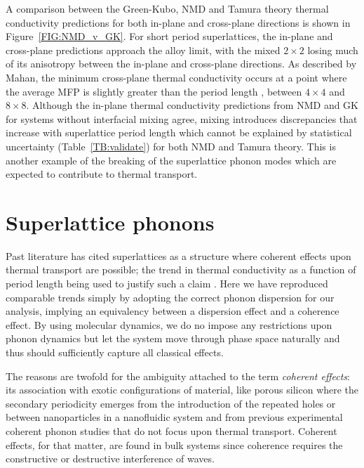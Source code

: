 \documentclass[aps,prb,preprint,preprintnumbers,amsmath,amssymb,floatfix,superscriptaddress]{revtex4}
\begin{document}
A comparison between the Green-Kubo, NMD and Tamura theory thermal conductivity predictions for both in-plane and cross-plane directions is shown in Figure~\ref{FIG:NMD_v_GK}. For short period superlattices, the in-plane and cross-plane predictions approach the alloy limit, with the mixed $2\times 2$ losing much of its anisotropy between the in-plane and cross-plane directions. As described by Mahan, the minimum cross-plane thermal conductivity occurs at a point where the average MFP is slightly greater than the period length \cite{PhysRevLett.84.927}, between $4 \times 4$ and $8 \times 8$. Although the in-plane thermal conductivity predictions from NMD and GK for systems without interfacial mixing agree, mixing introduces discrepancies that increase with superlattice period length which cannot be explained by statistical uncertainty (Table~\ref{TB:validate}) for both NMD and Tamura theory. This is another example of the breaking of the superlattice phonon modes which are expected to contribute to thermal transport.

\section{Superlattice phonons}

Past literature has cited superlattices as a structure where coherent effects upon thermal transport are possible; the trend in thermal conductivity as a function of period length being used to justify such a claim \cite{PhysRevB.67.195311,PhysRevB.72.174302,PhysRevB.61.3091}. Here we have reproduced comparable trends simply by adopting the correct phonon dispersion for our analysis, implying an equivalency between a dispersion effect and a coherence effect. By using molecular dynamics, we do no impose any restrictions upon phonon dynamics but let the system move through phase space naturally and thus should sufficiently capture all classical effects.

The reasons are twofold for the ambiguity attached to the term \textit {coherent effects}: its association with exotic configurations of material, like porous silicon \cite{doi:10.1021/nl102918q} where the secondary periodicity emerges from the introduction of the repeated holes or between nanoparticles in a nanofluidic system \cite{Keblinski2002855} and from previous experimental coherent phonon studies \cite{PhysRevLett.73.740,PhysRevB.75.195309} that do not focus upon thermal transport. Coherent effects, for that matter, are found in bulk systems since coherence requires the constructive or destructive interference of waves.
\end{document}
